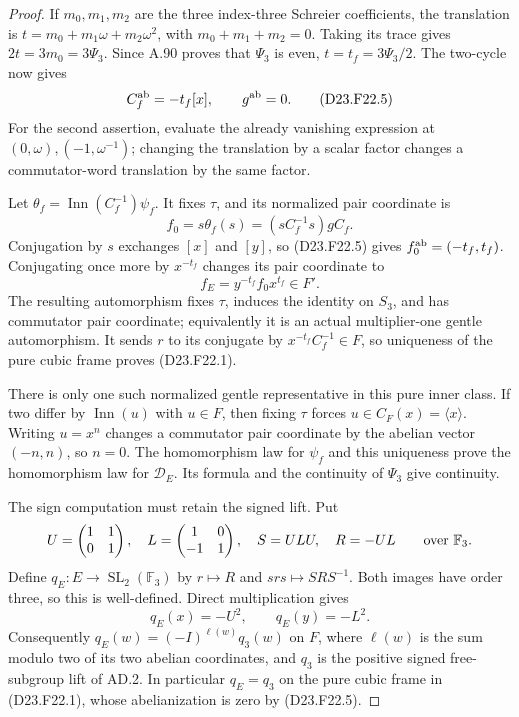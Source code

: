 \begin{proof}
If $m_0,m_1,m_2$ are the three index-three Schreier coefficients,
the translation is $t=m_0+m_1\omega+m_2\omega^2$, with
$m_0+m_1+m_2=0$. Taking its trace gives
$2t=3m_0=3\Psi_3$. Since \textup{A.90} proves that $\Psi_3$ is
even, $t=t_f=3\Psi_3/2$.
The two-cycle now gives
\[
 C_f^{\rm ab}=-t_f[x],\qquad g^{\rm ab}=0.                    \tag{D23.F22.5}
\]
For the second assertion, evaluate the already vanishing expression
at $(0,\omega),(-1,\omega^{-1})$; changing the translation by a
scalar factor changes a commutator-word translation by the same
factor.

Let $\theta_f=\operatorname{Inn}(C_f^{-1})\psi_f$. It fixes
$\tau$, and its normalized pair coordinate is
\[
 f_0=s\theta_f(s)=(sC_f^{-1}s)gC_f.
\]
Conjugation by $s$ exchanges $[x]$ and $[y]$, so (D23.F22.5)
gives $f_0^{\rm ab}=(-t_f,t_f)$.
Conjugating once more by $x^{-t_f}$ changes its pair coordinate to
\[
 f_E=y^{-t_f}f_0x^{t_f}\in F'.
\]
The resulting automorphism fixes $\tau$, induces the identity on
$S_3$, and has commutator pair coordinate; equivalently it is an
actual multiplier-one gentle automorphism. It sends $r$ to its
conjugate by $x^{-t_f}C_f^{-1}\in F$, so uniqueness of the pure
cubic frame proves (D23.F22.1).

There is only one such normalized gentle representative in this
pure inner class. If two differ by $\operatorname{Inn}(u)$ with
$u\in F$, then fixing $\tau$ forces $u\in C_F(x)=\langle x\rangle$.
Writing $u=x^n$ changes a commutator pair coordinate by the
abelian vector $(-n,n)$, so $n=0$. The homomorphism law for
$\psi_f$ and this uniqueness prove the homomorphism law for
$\mathcal D_E$. Its formula and the continuity of $\Psi_3$ give
continuity.

The sign computation must retain the signed lift. Put
\[
 U=\begin{pmatrix}1&1\\0&1\end{pmatrix},\quad
 L=\begin{pmatrix}1&0\\-1&1\end{pmatrix},\quad
 S=ULU,\quad R=-UL
 \qquad\hbox{over }\mathbb F_3.
\]
Define $q_E:E\to\operatorname{SL}_2(\mathbb F_3)$ by
$r\mapsto R$ and $srs\mapsto SRS^{-1}$. Both images have order
three, so this is well-defined. Direct multiplication gives
\[
 q_E(x)=-U^2,\qquad q_E(y)=-L^2.
\]
Consequently $q_E(w)=(-I)^{\ell(w)}q_3(w)$ on $F$, where
$\ell(w)$ is the sum modulo two of its two abelian coordinates,
and $q_3$ is the positive signed free-subgroup lift of \textup{AD.2}.
In particular $q_E=q_3$ on the pure cubic frame in (D23.F22.1),
whose abelianization is zero by (D23.F22.5).


\end{proof}
